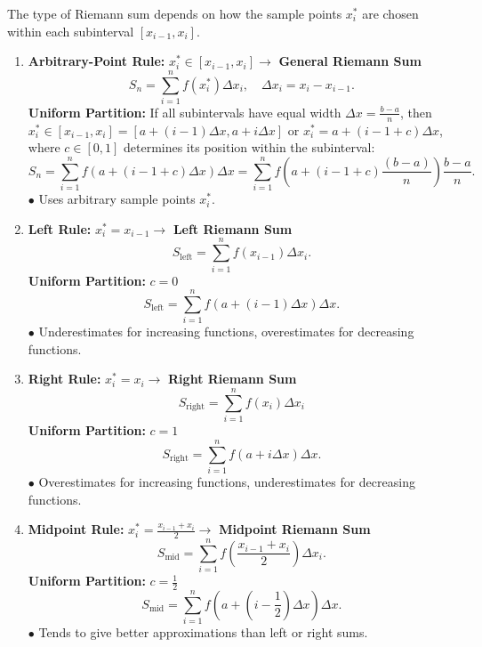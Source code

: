 \documentclass[a4paper,11pt]{article}
\theoremstyle{definition}
\theoremstyle{plain}
\theoremstyle{remark}
\begin{document}
\begin{tcolorbox}[breakable]
    The type of Riemann sum depends on how the sample points $x_i^*$ are chosen within each subinterval $[x_{i-1}, x_i]$.
    \begin{enumerate}
        \item \textbf{Arbitrary-Point Rule:} $x_i^* \in [x_{i-1}, x_i] \rightarrow$ \textbf{General Riemann Sum}
        \[
        S_n = \sum_{i=1}^{n} f(x_i^*) \Delta x_i, \quad \Delta x_i = x_i - x_{i-1}.
        \]
        \textbf{Uniform Partition:} If all subintervals have equal width $\Delta x = \frac{b-a}{n}$, then \\ $x_i^* \in [x_{i-1}, x_i] = [a + (i - 1) \Delta x, a + i \Delta x]$ or $x_i^* = a + (i - 1 + c) \Delta x$, where $c \in [0,1]$ determines its position within the subinterval:
        \[
        S_n = \sum_{i=1}^{n} f(a + (i - 1 + c) \Delta x) \Delta x = \sum_{i=1}^{n} f(a + (i - 1 + c) \frac{(b - a)}{n}) \frac{b - a}{n}.
        \]
        $\bullet$ Uses arbitrary sample points $x_i^*$.
    
        \item \textbf{Left Rule:} $x_i^* = x_{i-1}\rightarrow$ \textbf{Left Riemann Sum}
        \[
        S_{\text{left}} = \sum_{i=1}^n f(x_{i-1}) \Delta x_i.
        \]
        \textbf{Uniform Partition:} $c = 0$
        \[
        S_{\text{left}} = \sum_{i=1}^n f(a + (i - 1) \Delta x) \Delta x.
        \]
        $\bullet$ Underestimates for increasing functions, overestimates for decreasing functions.
        
        \item \textbf{Right Rule:} $x_i^* = x_i\rightarrow$ \textbf{Right Riemann Sum}
        \[
        S_{\text{right}} = \sum_{i=1}^n f(x_i) \Delta x_i    
        \]
        \textbf{Uniform Partition:} $c = 1$
        \[
        S_{\text{right}} = \sum_{i=1}^n f(a + i \Delta x) \Delta x.
        \]
        $\bullet$ Overestimates for increasing functions, underestimates for decreasing functions.
        
        \item \textbf{Midpoint Rule:} $x_i^* = \frac{x_{i-1} + x_i}{2} \rightarrow$ \textbf{Midpoint Riemann Sum}
        \[
        S_{\text{mid}} = \sum_{i=1}^n f\left( \frac{x_{i-1} + x_i}{2} \right) \Delta x_i.
        \]
        \textbf{Uniform Partition:} $c = \frac{1}{2}$
        \[
        S_{\text{mid}} = \sum_{i=1}^n f(a + (i - \frac{1}{2}) \Delta x) \Delta x.
        \]
        $\bullet$ Tends to give better approximations than left or right sums.
        

\end{enumerate}
\end{tcolorbox}
\end{document}

